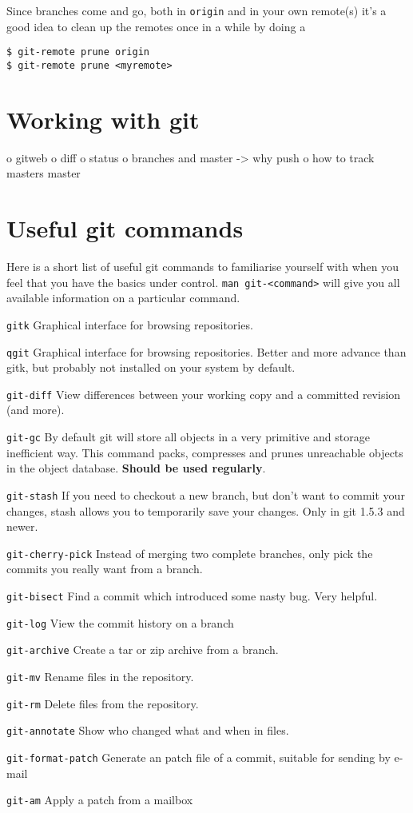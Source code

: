\documentclass[a4paper,10pt]{article}
\begin{document}
Since branches come and go, both in {\tt origin} and in your own remote(s)
it's a good idea to clean up the remotes once in a while by doing a
\begin{verbatim}
$ git-remote prune origin
$ git-remote prune <myremote>
\end{verbatim}

\section{Working with git}
o gitweb
o diff
o status
o branches and master -> why push
o how to track masters master

\section{Useful git commands}
Here is a short list of useful git commands to familiarise yourself with when
you feel that you have the basics under control. {\tt man git-<command>} will
give you all available information on a particular command.
\begin{description}
\item{\tt gitk} Graphical interface for browsing repositories.
\item{\tt qgit} Graphical interface for browsing repositories. Better and more
advance than gitk, but probably not installed on your system by default.
\item{\tt git-diff} View differences between your working copy and a committed
revision (and more).
\item{\tt git-gc} By default git will store all objects in a very primitive
and storage inefficient way. This command packs, compresses and prunes
unreachable objects in the object database. {\bf Should be used regularly}.
\item{\tt git-stash} If you need to checkout a new branch, but don't want to
commit your changes, stash allows you to temporarily save your changes. Only
in git 1.5.3 and newer.
\item{\tt git-cherry-pick} Instead of merging two complete branches, only pick the
commits you really want from a branch.
\item{\tt git-bisect} Find a commit which introduced some nasty bug. Very
helpful.
\item{\tt git-log} View the commit history on a branch
\item{\tt git-archive} Create a tar or zip archive from a branch.
\item{\tt git-mv} Rename files in the repository.
\item{\tt git-rm} Delete files from the repository.
\item{\tt git-annotate} Show who changed what and when in files.
\item{\tt git-format-patch} Generate an patch file of a commit, suitable for
sending by e-mail
\item{\tt git-am} Apply a patch from a mailbox

\end{description}
\end{document}
